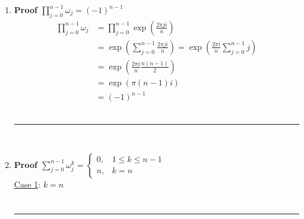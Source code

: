 \documentclass{article}%
\newcommand\EXP[1]{\exp\left(#1\right)}
\newenvironment{proof}[1][]{\begin{samepage}\textbf{Proof #1} \\ }{\\ \rule{0.5em}{0.5em} \end{samepage} \\}
\begin{document}
\begin{enumerate}
\begin{enumerate}[label=\alph*]
        \begin{proof}[$\omega_0+...+\omega_{n-1} = 0$]
        \begin{align*}
            \omega_j &= \EXP{\frac{2 \pi j i}{n}}\\
            \omega_0+...+\omega_{n-1} &= \EXP{0} + \EXP{\frac{2\pi i}{n}} +  \EXP{\frac{4\pi i}{n}} +  ... + \EXP{\frac{2 \pi (n-1) i}{n}} \\
                                      &= \EXP{\frac{2\pi i}{n}}^0+\EXP{\frac{2\pi i}{n}}^1+\EXP{\frac{2\pi i}{n}}^2+...+\EXP{\frac{2\pi i}{n}}^{n-1} \\
                                      &= \sum\limits_{j=0}^{n-1} \EXP{\frac{2\pi i}{n}}^j \\
                                      &= \frac{1-\EXP{\frac{2\pi i}{n}}^n}{1 - \EXP{\frac{2\pi i}{n}}} = \frac{1-\EXP{2\pi i}}{1 - \EXP{\frac{2\pi i}{n}}} \\
                                      &= 0
        \end{align*}
        \end{proof}
        \item %
        \begin{proof}[$\prod\limits_{j=0}^{n-1} \omega_j = (-1)^{n-1}$]
            \begin{align*}
                \prod\limits_{j=0}^{n-1} \omega_j &= \prod\limits_{j=0}^{n-1} \EXP{\frac{2\pi ji}{n}} \\
                                                  &= \EXP{\sum\limits_{j=0}^{n-1}\frac{2\pi j i}{n}} = \EXP{\frac{2\pi i}{n} \sum\limits_{j=0}^{n-1}j} \\
                                                  &= \EXP{\frac{2\pi i}{n} \frac{n(n-1)}{2}} \\
                                                  &= \EXP{\pi (n - 1) i} \\
                                                  &= (-1)^{n-1}
            \end{align*}
        \end{proof}
        \item %
        \begin{proof}[$\sum\limits_{j=0}^{n-1}{\omega_j^k}=\left\{ \begin{array} {lr} 0, & 1 \leq k \leq n-1 \\ n, & k=n \end{array} \right. $]
            \underline{Case 1}: $k=n$
            \begin{eqnarray*}

\end{eqnarray*}
\end{proof}
\end{enumerate}
\end{enumerate}
\end{document}
